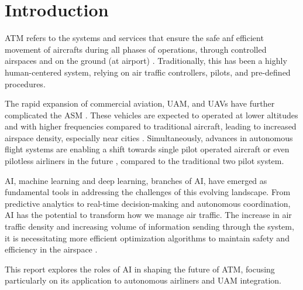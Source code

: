 \section{Introduction}


\Gls{ATM} refers to the systems and services that ensure the safe anf efficient movement of aircrafts during all phases of operations, through controlled airspaces and on the ground (at airport) \cite{skybraryATM}. 
Traditionally, this has been a highly human-centered system, relying on air traffic controllers, pilots, and pre-defined procedures.

The rapid expansion of commercial aviation, \gls{UAM}, and \glspl{UAV} have further complicated the \gls{ASM} \cite{Ramachandran_2025}.
These vehicles are expected to operated at lower altitudes and with higher frequencies compared to traditional aircraft, leading to increased airspace density, especially near cities \cite{Schuchardt_2023}.
Simultaneously, advances in autonomous flight systems are enabling a shift towards single pilot operated aircraft or even pilotless airliners in the future \cite{Vance_2019}, compared to the traditional two pilot system.

\gls{AI}, machine learning and deep learning, branches of \gls{AI}, have emerged as fundamental tools in addressing the challenges of this evolving landscape.
From predictive analytics to real-time decision-making and autonomous coordination, \gls{AI} has the potential to transform how we manage air traffic.
The increase in air traffic density and increasing volume of information sending through the system, it is necessitating more efficient optimization algorithms to maintain safety and efficiency in the airspace \cite{Tafur_2025}.

This report explores the roles of \gls{AI} in shaping the future of \gls{ATM}, focusing particularly on its application to autonomous airliners and \gls{UAM} integration.